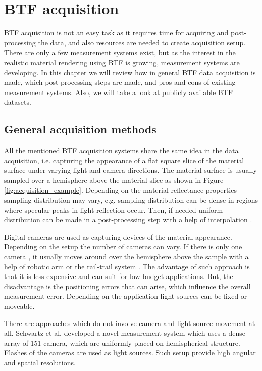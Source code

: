 \chapter{BTF acquisition}
\label{chapter:acquisition}

BTF acquisition is not an easy task as it requires time for acquiring and post-processing the data, and also resources are needed to create acquisition setup.
There are only a few measurement systems \cite{star2004,schwartz,dana,Kaleidoscope,Koudelka,statistical_acq} exist, but as the interest in the realistic material rendering using BTF is growing, measurement systems are developing.
In this chapter we will review how in general BTF data acquisition is made, which post-processing steps are made, and pros and cons of existing measurement systems. 
Also, we will take a look at publicly available BTF datasets.

\section{General acquisition methods}
\label{section:General_acquisition}	
All the mentioned BTF acquisition systems share the same idea in the data acquisition, i.e. capturing the appearance of a flat square slice of the material surface under varying light and camera directions.
The material surface is usually sampled over a hemisphere above the material slice as shown in Figure \ref{fig:acquisition_example}.
Depending on the material reflectance properties sampling distribution may vary, e.g. sampling distribution can be dense in regions where specular peaks in light reflection occur. 
Then, if needed uniform distribution can be made in a post-processing step with a help of interpolation \cite{haindl_visual}.

Digital cameras are used as capturing devices of the material appearance. Depending on the setup the number of cameras can vary.
 If there is only one camera \cite{star2004,statistical_acq,dana}, it usually moves around over the hemisphere above the sample with a help of robotic arm or the rail-trail system \cite{star2004}. 
 The advantage of such approach is that it is less expensive and can suit for low-budget applications.
But, the disadvantage is the positioning errors that can arise, which influence the overall measurement error. 
Depending on the application light sources can be fixed or moveable.

There are approaches which do not involve camera and light source movement at all.
Schwartz et al. \cite{schwartz} developed a novel measurement system which uses a dense array of 151 camera, which are uniformly placed on hemispherical structure.
Flashes of the cameras are used as light sources. Such setup provide high angular and spatial resolutions.

